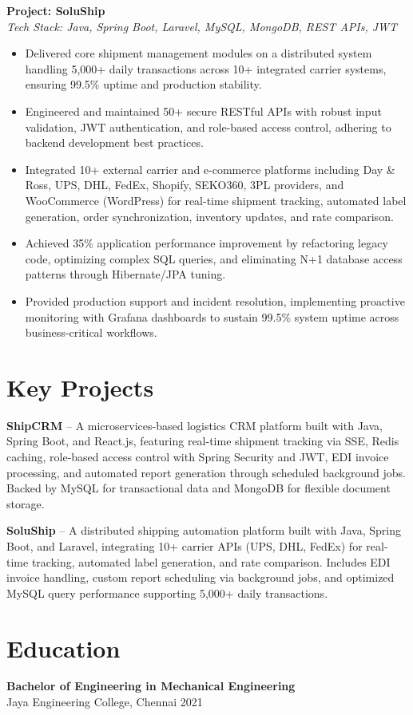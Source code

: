 \documentclass[a4paper,10pt]{article}
\begin{document}
\textbf{Project: SoluShip} \\
\textit{Tech Stack: Java, Spring Boot, Laravel, MySQL, MongoDB, REST APIs, JWT}
\begin{itemize}
    \item Delivered core shipment management modules on a distributed system handling 5,000+ daily transactions across 10+ integrated carrier systems, ensuring 99.5\% uptime and production stability.

    \item Engineered and maintained 50+ secure RESTful APIs with robust input validation, JWT authentication, and role-based access control, adhering to backend development best practices.

    \item Integrated 10+ external carrier and e-commerce platforms including Day \& Ross, UPS, DHL, FedEx, Shopify, SEKO360, 3PL providers, and WooCommerce (WordPress) for real-time shipment tracking, automated label generation, order synchronization, inventory updates, and rate comparison.

    \item Achieved 35\% application performance improvement by refactoring legacy code, optimizing complex SQL queries, and eliminating N+1 database access patterns through Hibernate/JPA tuning.

    \item Provided production support and incident resolution, implementing proactive monitoring with Grafana dashboards to sustain 99.5\% system uptime across business-critical workflows.
\end{itemize}

\vspace{-12pt}

\section*{Key Projects}

\noindent\textbf{ShipCRM} -- A microservices-based logistics CRM platform built with Java, Spring Boot, and React.js, featuring real-time shipment tracking via SSE, Redis caching, role-based access control with Spring Security and JWT, EDI invoice processing, and automated report generation through scheduled background jobs. Backed by MySQL for transactional data and MongoDB for flexible document storage.

\vspace{3pt}

\noindent\textbf{SoluShip} -- A distributed shipping automation platform built with Java, Spring Boot, and Laravel, integrating 10+ carrier APIs (UPS, DHL, FedEx) for real-time tracking, automated label generation, and rate comparison. Includes EDI invoice handling, custom report scheduling via background jobs, and optimized MySQL query performance supporting 5,000+ daily transactions.

\vspace{-12pt}

\section*{Education}

\textbf{Bachelor of Engineering in Mechanical Engineering} \\
Jaya Engineering College, Chennai \hfill 2021
\end{document}
